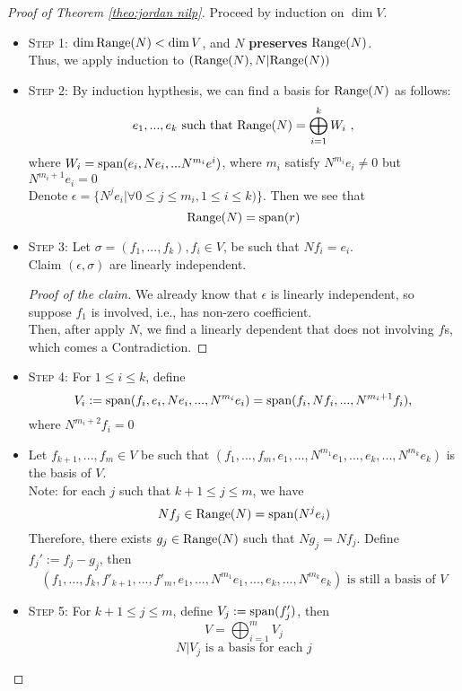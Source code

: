 \documentclass{aq-notes}
\newcommand{\Range}{\mbox{\normalfont Range}}
\newcommand{\Span}{\mbox{\normalfont span}}
\begin{document}
    \begin{proof}[Proof of Theorem \ref{theo:jordan nilp}]
        Proceed by induction on $\dim V$.
        \begin{itemize}
            \item {\scshape Step 1}: $\dim \Range(N)< \dim V$, and $N$ \textbf{preserves} $\Range(N)$. \\
            Thus, we apply induction to $(\Range(N), N\vert {\Range(N)})$
            \item {\scshape Step 2}: By induction hypthesis, we can find a basis for $\Range(N)$ as follows:
            \[e_1,...,e_k\mbox{ such that }\Range(N) = \bigoplus_{i=1}^kW_i\ ,\] where $W_i = \Span(e_i,Ne_i,...N^{m_i}e^i)$, where $m_i$ satisfy $N^{m_i}e_i \neq 0$ but $N^{m_i+1}e_i = 0$ \\
            Denote $\epsilon = \{N^je_i | \forall 0\leq j\leq m_i, 1\leq i \leq k)\}$. Then we see that 
            \[\Range(N) = \Span(r) \]
            \item {\scshape Step 3}: Let $\sigma = (f_1,...,f_k), f_i\in V$, be such that $Nf_i = e_i$.\\
            Claim $(\epsilon, \sigma)$ are linearly independent.
            \begin{proof}[Proof of the claim]
                We already know that $\epsilon$ is linearly independent, so suppose $f_1$ is involved, i.e., has non-zero coefficient.\\
                Then, after apply $N$, we find a linearly dependent that does not involving $f$s, which comes a Contradiction.
            \end{proof}
            \item {\scshape Step 4}: For $1\leq i\leq k$, define \[V_i := \Span(f_i,e_i,Ne_i,...,N^{m_i}e_i) = \Span(f_i,Nf_i,...,N^{m_i+1}f_i),\] where $N^{m_i+2}f_i = 0$
            \item Let $f_{k+1},...,f_m\in V$ be such that $(f_1,...,f_m,e_1,...,N^{m_1}e_1,...,e_k,...,N^{m_k}e_k)$ is the basis of $V$.\\
            Note: for each $j$ such that  $k+1\leq j\leq m$, we have
            \[Nf_j \in \Range(N) = \Span(N^je_i)\]
            Therefore, there exists $g_j\in \Range(N)$ such that $Ng_j = Nf_j$. Define $f_j' := f_j-g_j$, then 
            \[(f_1,...,f_k,f'_{k+1},...,f'_m,e_1,...,N^{m_1}e_1,...,e_k,...,N^{m_k}e_k)\mbox{ is still a basis of }V\]
            \item {\scshape Step 5}: For $k+1\leq j \leq m$, define $V_j := \Span(f'_j)$, then
            \[V = \bigoplus_{i=1}^m V_j\]
            \[N\vert {V_j} \mbox{ is a basis for each }j\]
        \end{itemize}
        
    \end{proof}
\end{document}
